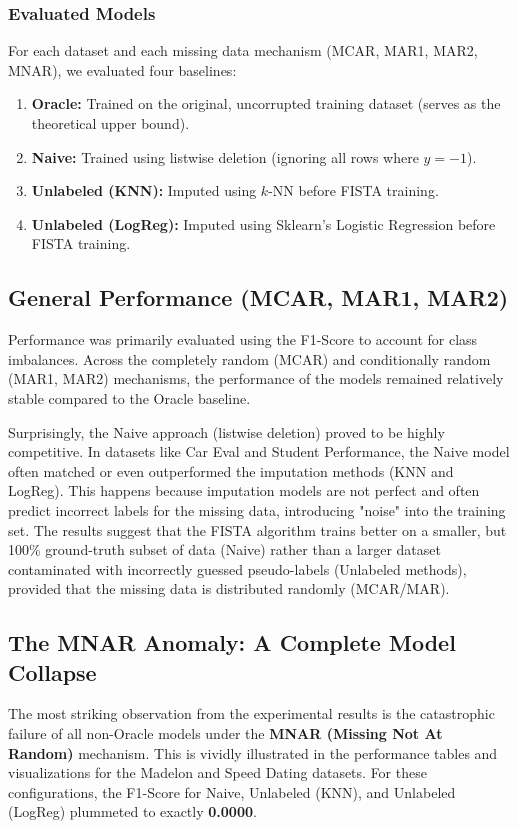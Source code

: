 \documentclass[12pt,a4paper]{article}
\begin{document}
\subsubsection{Evaluated Models}
For each dataset and each missing data mechanism (MCAR, MAR1, MAR2, MNAR), we evaluated four baselines:
\begin{enumerate}
    \item \textbf{Oracle:} Trained on the original, uncorrupted training dataset (serves as the theoretical upper bound).
    \item \textbf{Naive:} Trained using listwise deletion (ignoring all rows where $y = -1$).
    \item \textbf{Unlabeled (KNN):} Imputed using $k$-NN before FISTA training.
    \item \textbf{Unlabeled (LogReg):} Imputed using Sklearn's Logistic Regression before FISTA training.
\end{enumerate}

\subsection{General Performance (MCAR, MAR1, MAR2)}

Performance was primarily evaluated using the F1-Score to account for class imbalances. Across the completely random (MCAR) and conditionally random (MAR1, MAR2) mechanisms, the performance of the models remained relatively stable compared to the Oracle baseline. 

Surprisingly, the Naive approach (listwise deletion) proved to be highly competitive. In datasets like Car Eval and Student Performance, the Naive model often matched or even outperformed the imputation methods (KNN and LogReg). This happens because imputation models are not perfect and often predict incorrect labels for the missing data, introducing "noise" into the training set. The results suggest that the FISTA algorithm trains better on a smaller, but 100\% ground-truth subset of data (Naive) rather than a larger dataset contaminated with incorrectly guessed pseudo-labels (Unlabeled methods), provided that the missing data is distributed randomly (MCAR/MAR).

\subsection{The MNAR Anomaly: A Complete Model Collapse}

The most striking observation from the experimental results is the catastrophic failure of all non-Oracle models under the \textbf{MNAR (Missing Not At Random)} mechanism. This is vividly illustrated in the performance tables and visualizations for the Madelon and Speed Dating datasets. For these configurations, the F1-Score for Naive, Unlabeled (KNN), and Unlabeled (LogReg) plummeted to exactly \textbf{0.0000}.
\end{document}
